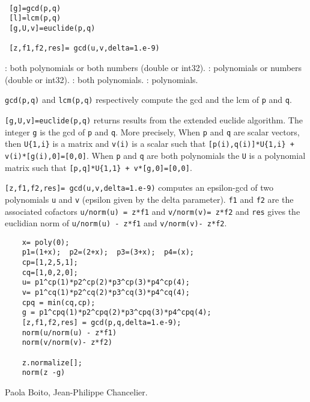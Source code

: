 \begin{mandesc}
  \\
  \\
  \\
\end{mandesc}
\begin{calling_sequence}
\begin{verbatim}
 [g]=gcd(p,q)  
 [l]=lcm(p,q)  
 [g,U,v]=euclide(p,q)

 [z,f1,f2,res]= gcd(u,v,delta=1.e-9)
\end{verbatim}
\end{calling_sequence}
\begin{parameters}
  \begin{varlist}
    : both polynomials or both numbers (double or int32).
    : polynomials or numbers (double or int32).
    : both polynomials. 
    : polynomials. 
  \end{varlist}
\end{parameters}
\begin{mandescription}
  \noindent\verb+gcd(p,q)+ and \verb+lcm(p,q)+ respectively compute 
  the gcd and the lcm of \verb+p+ and \verb+q+. 

  \noindent\verb+[g,U,v]=euclide(p,q)+ returns results from the extended 
  euclide algorithm. The integer \verb+g+ is the gcd of \verb+p+ and \verb+q+. 
  More precisely, When \verb+p+ and \verb+q+ are scalar vectors, then \verb+U{1,i}+ is a matrix and 
  \verb+v(i)+ is a scalar such that \verb-[p(i),q(i)]*U{1,i} + v(i)*[g(i),0]=[0,0]-. When 
  \verb+p+ and \verb+q+ are both polynomials the \verb+U+ is a polynomial matrix 
  such that \verb-[p,q]*U{1,1} + v*[g,0]=[0,0]-.
  
  \verb+[z,f1,f2,res]= gcd(u,v,delta=1.e-9)+ computes an epsilon-gcd of 
  two polynomials \verb+u+ and \verb+v+ (epsilon given by the delta parameter). 
  \verb+f1+ and \verb+f2+ are the associated cofactors \verb+u/norm(u) = z*f1+ and 
  \verb+v/norm(v)= z*f2+ and \verb+res+ gives the euclidian norm of \verb+u/norm(u) - z*f1+ 
  and \verb+v/norm(v)- z*f2+.
\end{mandescription}
\begin{examples}
  \begin{Verbatim}
    x= poly(0);
    p1=(1+x);  p2=(2+x);  p3=(3+x);  p4=(x);
    cp=[1,2,5,1];
    cq=[1,0,2,0];
    u= p1^cp(1)*p2^cp(2)*p3^cp(3)*p4^cp(4);
    v= p1^cq(1)*p2^cq(2)*p3^cq(3)*p4^cq(4);
    cpq = min(cq,cp);
    g = p1^cpq(1)*p2^cpq(2)*p3^cpq(3)*p4^cpq(4);
    [z,f1,f2,res] = gcd(p,q,delta=1.e-9);
    norm(u/norm(u) - z*f1)
    norm(v/norm(v)- z*f2)

    z.normalize[];
    norm(z -g) 
  \end{Verbatim}
\end{examples}
\begin{manseealso}
\end{manseealso}
\begin{authors}
  Paola Boito, Jean-Philippe Chancelier.
\end{authors}

